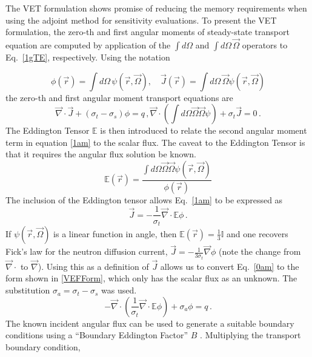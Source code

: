 \documentclass[12pt]{report}
\newcommand{\vr}{\vec{r}}
\newcommand{\vO}{\vec{\Omega}}
\renewcommand{\div}{\vec{\nabla} \cdot}
\newcommand{\grad}{\vec{\nabla}}
\newcommand{\Edd}{\mathbb{E}}
\newcommand{\BEdd}{B}
\newcommand{\sigt}{\sigma_t}
\newcommand{\sigs}{\sigma_s}
\newcommand{\siga}{\sigma_a}
\newcommand{\scalSource}{q}
\begin{document}
The VET formulation shows promise of reducing the memory requirements when using the adjoint method for sensitivity evaluations. To present the VET formulation, the zero-th and first angular moments of steady-state transport equation are computed by application of the $\int d \Omega$ and $\int d \Omega \, \vO$ operators to Eq.~\eqref{1gTE}, respectively. Using the notation

\begin{equation}
\label{VETFormStart}
\phi(\vr)=\int d\Omega \, \psi( \vr,\vO )
,\quad
\vec{J}(\vr)= \int d\Omega \, \vO \psi( \vr,\vO )
\end{equation}
the zero-th and first angular moment transport equations are
%
\begin{subequations}
%
\begin{equation}
\label{0am}
\div \vec{J} + (\sigt-\sigs) \phi = \scalSource \,,
\end{equation}
%
\begin{equation}
\label{1am}
\div \left(  \int d\Omega \vO \vO \psi \right) + \sigt \vec{J} = 0 \,.
\end{equation}
%
\end{subequations}
The Eddington Tensor $\Edd$ is then introduced to relate the second angular moment term in equation \eqref{1am} to the scalar flux. The caveat to the Eddington Tensor is that it requires the angular flux solution be known.
\begin{equation}
\label{EddDef}
\Edd(\vr)=\frac{\int d\Omega \vO \vO \psi(\vr,\vO)}{\phi(\vr)}
\end{equation}
The inclusion of the Eddington tensor allows Eq.~\eqref{1am} to be expressed as 
\[
\vec{J} = - \frac{1}{\sigt} \div \Edd \phi \,.
\]
If $\psi(\vr,\vO)$ is a linear function in angle, then $\Edd(\vr)=\tfrac{1}{3}\mathbb{I}$ and one recovers Fick's law for the neutron diffusion current, $\vec{J} = - \frac{1}{3\sigt} \grad \phi$ (note the change from $\div$ to $\grad$). Using this as a definition of $\vec{J}$ allows us to convert Eq.~\eqref{0am} to the form shown in \eqref{VEFForm}, which only has the scalar flux as an unknown. The substitution $\siga = \sigt-\sigs$ was used.
\begin{equation}
\label{VEFForm}
- \div \left( \frac{1}{\sigt}\div \Edd \phi \right) + \siga \phi = \scalSource \,.
\end{equation}
The known incident angular flux can be used to generate a suitable boundary conditions using a 
``Boundary Eddington Factor'' $\BEdd$ \cite{Miften}. Multiplying the transport boundary condition,
\end{document}
